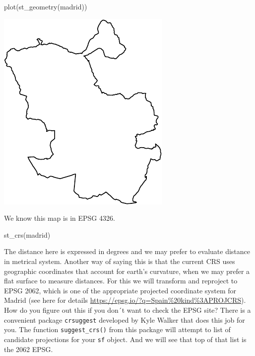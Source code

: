 \documentclass[
]{book}
\makeatletter
\newenvironment{Shaded}{\begin{snugshade}}{\end{snugshade}}
\newcommand{\FunctionTok}[1]{\textcolor[rgb]{0,0,0}{#1}}
\newcommand{\NormalTok}[1]{#1}
\newenvironment{kframe}{%
\medskip{}
\setlength{\fboxsep}{.8em}
 \def\at@end@of@kframe{}%
 \ifinner\ifhmode%
  \def\at@end@of@kframe{\end{minipage}}%
  \begin{minipage}{\columnwidth}%
 \fi\fi%
 \def\FrameCommand##1{\hskip\@totalleftmargin \hskip-\fboxsep
 \colorbox{shadecolor}{##1}\hskip-\fboxsep
     \hskip-\linewidth \hskip-\@totalleftmargin \hskip\columnwidth}%
 \MakeFramed {\advance\hsize-\width
   \@totalleftmargin\z@ \linewidth\hsize
   \@setminipage}}%
 {\par\unskip\endMakeFramed%
 \at@end@of@kframe}
\renewenvironment{Shaded}{\begin{kframe}}{\end{kframe}}
\makeatother
\begin{document}
\begin{Shaded}
\begin{Highlighting}[]
\FunctionTok{plot}\NormalTok{(}\FunctionTok{st\_geometry}\NormalTok{(madrid))}
\end{Highlighting}
\end{Shaded}

\includegraphics{crime_mapping_files/figure-latex/unnamed-chunk-65-1.pdf}

We know this map is in EPSG 4326.

\begin{Shaded}
\begin{Highlighting}[]
\FunctionTok{st\_crs}\NormalTok{(madrid)}
\end{Highlighting}
\end{Shaded}

The distance here is expressed in degrees and we may prefer to evaluate distance in metrical system. Another way of saying this is that the current CRS uses geographic coordinates that account for earth's curvature, when we may prefer a flat surface to measure distances. For this we will transform and reproject to EPSG 2062, which is one of the appropriate projected coordinate system for Madrid (see here for details \url{https://epsg.io/?q=Spain\%20kind\%3APROJCRS}). How do you figure out this if you don´t want to check the EPSG site? There is a convenient package \texttt{crsuggest} developed by Kyle Walker that does this job for you. The function \texttt{suggest\_crs()} from this package will attempt to list of candidate projections for your \texttt{sf} object. And we will see that top of that list is the 2062 EPSG.
\end{document}
